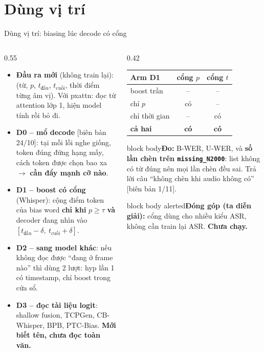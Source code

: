 \documentclass[aspectratio=169,xcolor=table]{beamer}
\newcommand{\hi}[1]{\textcolor{Primary}{\textbf{#1}}}
\newcommand{\bad}[1]{\textcolor{RiskRed}{\textbf{#1}}}
\newcommand{\good}[1]{\textcolor{GoodGreen}{\textbf{#1}}}
\newcommand{\src}[1]{{\tiny\color{TextGray}[#1]}}
\newcommand{\ra}{$\rightarrow$}
\newcommand{\nbox}[2][block body]{\begin{beamercolorbox}[sep=0.45em,rounded=true]{#1}\footnotesize #2\end{beamercolorbox}}
\begin{document}
\section{Dùng vị trí}
\begin{frame}{Dùng vị trí: biasing lúc decode có cổng}
\begin{columns}[T]
\begin{column}{0.55\textwidth}
\footnotesize
\begin{itemize}\setlength{\itemsep}{3pt}
\item \textbf{Đầu ra mới} (không train lại): (từ, $p$, $t_{\text{đầu}}$, $t_{\text{cuối}}$, thời điểm từng âm vị). Với pxattn: đọc từ attention lớp 1, hiện model tính rồi bỏ đi.
\item \textbf{D0 -- mổ decode} \src{biên bản 24/10}: tại mỗi lỗi nghe giống, token đúng đứng hạng mấy, cách token được chọn bao xa \ra{} \hi{cần đẩy mạnh cỡ nào}.
\item \textbf{D1 -- boost có cổng} (Whisper): cộng điểm token của bias word \textbf{chỉ khi} $p\geq\tau$ \textbf{và} decoder đang nhìn vào $[t_{\text{đầu}}-\delta,\ t_{\text{cuối}}+\delta]$.
\item \textbf{D2 -- sang model khác}: nếu không đọc được ``đang ở frame nào'' thì dùng 2 lượt: hyp lần 1 có timestamp, chỉ boost trong cửa sổ.
\item \textbf{D3 -- đọc tài liệu logit}: shallow fusion, TCPGen, CB-Whisper, BPB, PTC-Bias. \bad{Mới biết tên, chưa đọc toàn văn.}
\end{itemize}
\end{column}
\begin{column}{0.42\textwidth}
\centering\scriptsize\setlength{\tabcolsep}{3pt}
\begin{tabular}{lcc}
\toprule
Arm D1 & cổng $p$ & cổng $t$\\
\midrule
boost trần & -- & --\\
chỉ $p$ & có & --\\
chỉ thời gian & -- & có\\
\textbf{cả hai} & \good{có} & \good{có}\\
\bottomrule
\end{tabular}\par
\vspace{0.2cm}\raggedright
\nbox{\textbf{Đo:} B-WER, U-WER, và \hi{số lần chèn trên \texttt{missing\_N2000}}: list không có từ đúng nên mọi lần chèn đều sai. Trả lời câu ``không chèn khi audio không có'' \src{biên bản 1/11}.}
\vspace{0.1cm}
\nbox[block body alerted]{\textbf{Đóng góp (ta diễn giải):} cổng dùng cho nhiều kiểu ASR, không cần train lại ASR. \bad{Chưa chạy.}}
\end{column}
\end{columns}
\end{frame}
\end{document}
